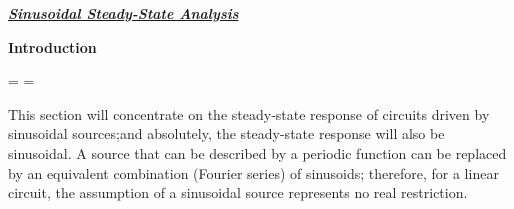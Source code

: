 \documentclass[a4paper,12pt,oneside]{report}
\newenvironment{tree}[4]{
\begin{list}{#1}{\parskip=0in \topsep=0in \itemsep=0in \parsep=0in \partopsep=0in \leftmargin=#2 \rightmargin=#3 \itemindent=#4 \listparindent=\itemindent}
}{\end{list}}
\newenvironment{ssection}[3]{
\framebox{\textbf{#1}} \textbf{#2}
\begin{tree}{#3}{0in}{0in}{\parindent}
}{\end{tree}}
\begin{document}
\begin{center}
{{\Huge \textbf{\emph{\underline{Sinusoidal Steady-State Analysis}}}}}\ \newline
\end{center}
\begin{ssection}{0}{Introduction}{{}}%
\item This section will concentrate on the steady-state response of circuits driven by sinusoidal sources;and absolutely, the steady-state response will also be sinusoidal. A source that can be described by a periodic function can be replaced by an equivalent combination (Fourier series) of sinusoids; therefore, for a linear circuit, the assumption of a sinusoidal source represents no real restriction.
\end{ssection}
\end{document}
